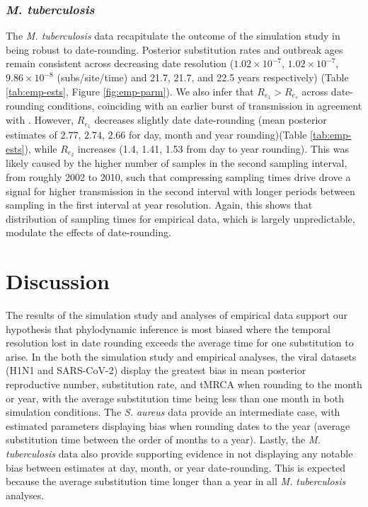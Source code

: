 \documentclass[12pt]{article}
\begin{document}
\begin{spacing}{2}
\subsubsection*{\textit{M. tuberculosis}}
The \textit{M. tuberculosis} data recapitulate the outcome of the simulation study in being robust to date-rounding. Posterior substitution rates and outbreak ages remain consistent across decreasing date resolution ($1.02\times10^{-7}$, $1.02\times10^{-7}$, $9.86\times10^{-8}$ (subs/site/time) and 21.7, 21.7, and 22.5 years respectively) (Table \ref{tab:emp-ests}, Figure \ref{fig:emp-parm}). We also infer that $R_{e_1} > R_{e_s}$ across date-rounding conditions, coinciding with an earlier burst of transmission in agreement with \citet{kuhnert_tuberculosis_2018}. However, $R_{e_1}$ decreases slightly date date-rounding (mean posterior estimates of $2.77$, $2.74$, $2.66$ for day, month and year rounding)(Table \ref{tab:emp-ests}), while $R_{e_2}$ increases (1.4, 1.41, 1.53 from day to year rounding). This was likely caused by the higher number of samples in the second sampling interval, from roughly 2002 to 2010, such that compressing sampling times drive drove a signal for higher transmission in the second interval with longer periods between sampling in the first interval at year resolution. Again, this shows that distribution of sampling times for empirical data, which is largely unpredictable, modulate the effects of date-rounding.

\section*{Discussion}
The results of the simulation study and analyses of empirical data support our hypothesis that phylodynamic inference is most biased where the temporal resolution lost in date rounding exceeds the average time for one substitution to arise. In the both the simulation study and empirical analyses, the viral datasets (H1N1 and SARS-CoV-2) display the greatest bias in mean posterior reproductive number, substitution rate, and tMRCA when rounding to the month or year, with the average substitution time being less than one month in both simulation conditions. The \textit{S. aureus} data provide an intermediate case, with estimated parameters displaying bias when rounding dates to the year (average substitution time between the order of months to a year). Lastly, the \textit{M. tuberculosis} data also provide supporting evidence in not displaying any notable bias between estimates at day, month, or year date-rounding. This is expected because the average substitution time longer than a year in all \textit{M. tuberculosis} analyses.  


\end{spacing}
\end{document}
